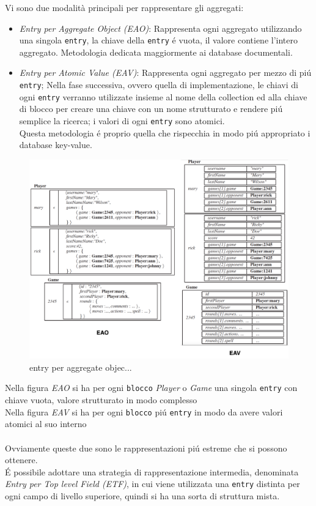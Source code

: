 Vi sono due modalità principali per rappresentare gli aggregati:
\begin{itemize}
    \item \emph{Entry per Aggregate Object (EAO)}: Rappresenta ogni aggregato utilizzando una singola
    \texttt{entry}, la chiave della \texttt{entry} é vuota, il valore contiene l'intero aggregato.
    Metodologia dedicata maggiormente ai database documentali.
    \item \emph{Entry per Atomic Value (EAV)}: Rappresenta ogni aggregato per mezzo di piú \texttt{entry};
    Nella fase successiva, ovvero quella di implementazione, le chiavi di ogni \texttt{entry} verranno utilizzate
    insieme al nome della collection ed alla chiave di blocco per creare una chiave con un
    nome strutturato e rendere piú semplice la ricerca;
    i valori di ogni \texttt{entry} sono atomici.\\
    Questa metodologia é proprio quella che rispecchia in modo piú appropriato i database key-value.
\end{itemize}
\vspace{0.5cm}
\begin{figure}[H]
    \begin{center}
        \includegraphics[width=1\textwidth]{img/eao.eav}
    \end{center}
    \caption{entry per aggregate objec...}
\end{figure}
Nella figura \emph{EAO} si ha per ogni \texttt{blocco} \emph{Player} o \emph{Game} una singola \texttt{entry} con chiave vuota,
valore strutturato in modo complesso
\\
Nella figura \emph{EAV} si ha per ogni \texttt{blocco} piú \texttt{entry} in modo da avere valori atomici al suo interno
\\
\\
Ovviamente queste due sono le rappresentazioni piú estreme che si possono ottenere.\\
É possibile adottare una strategia di rappresentazione intermedia, denominata \emph{Entry per Top level Field (ETF)}, in cui
viene utilizzata una \texttt{entry} distinta per ogni campo di livello superiore, quindi si ha una sorta di struttura mista.

